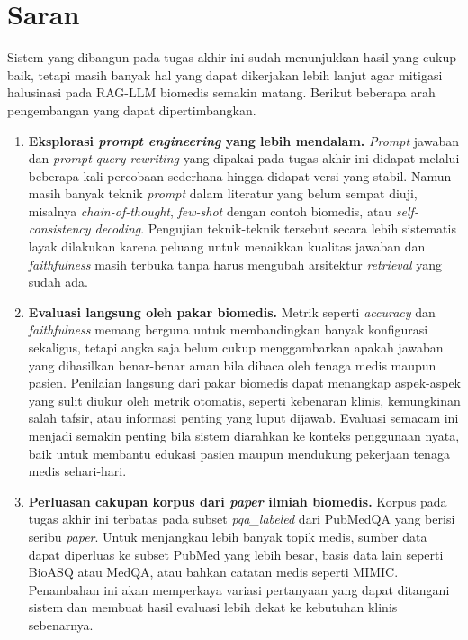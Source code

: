 \section{Saran}
\label{sec:saran}

Sistem yang dibangun pada tugas akhir ini sudah menunjukkan hasil yang cukup baik, tetapi masih banyak hal yang dapat dikerjakan lebih lanjut agar mitigasi halusinasi pada RAG-LLM biomedis semakin matang. Berikut beberapa arah pengembangan yang dapat dipertimbangkan.

\begin{enumerate}
    \item \textbf{Eksplorasi \textit{prompt engineering} yang lebih mendalam.}
    \textit{Prompt} jawaban dan \textit{prompt} \textit{query rewriting} yang dipakai pada tugas akhir ini didapat melalui beberapa kali percobaan sederhana hingga didapat versi yang stabil. Namun masih banyak teknik \textit{prompt} dalam literatur yang belum sempat diuji, misalnya \textit{chain-of-thought}, \textit{few-shot} dengan contoh biomedis, atau \textit{self-consistency decoding}. Pengujian teknik-teknik tersebut secara lebih sistematis layak dilakukan karena peluang untuk menaikkan kualitas jawaban dan \textit{faithfulness} masih terbuka tanpa harus mengubah arsitektur \textit{retrieval} yang sudah ada.

    \item \textbf{Evaluasi langsung oleh pakar biomedis.}
    Metrik seperti \textit{accuracy} dan \textit{faithfulness} memang berguna untuk membandingkan banyak konfigurasi sekaligus, tetapi angka saja belum cukup menggambarkan apakah jawaban yang dihasilkan benar-benar aman bila dibaca oleh tenaga medis maupun pasien. Penilaian langsung dari pakar biomedis dapat menangkap aspek-aspek yang sulit diukur oleh metrik otomatis, seperti kebenaran klinis, kemungkinan salah tafsir, atau informasi penting yang luput dijawab. Evaluasi semacam ini menjadi semakin penting bila sistem diarahkan ke konteks penggunaan nyata, baik untuk membantu edukasi pasien maupun mendukung pekerjaan tenaga medis sehari-hari.

    \item \textbf{Perluasan cakupan korpus dari \textit{paper} ilmiah biomedis.}
    Korpus pada tugas akhir ini terbatas pada subset \textit{pqa\_labeled} dari PubMedQA yang berisi seribu \textit{paper}. Untuk menjangkau lebih banyak topik medis, sumber data dapat diperluas ke subset PubMed yang lebih besar, basis data lain seperti BioASQ atau MedQA, atau bahkan catatan medis seperti MIMIC. Penambahan ini akan memperkaya variasi pertanyaan yang dapat ditangani sistem dan membuat hasil evaluasi lebih dekat ke kebutuhan klinis sebenarnya.


\end{enumerate}
